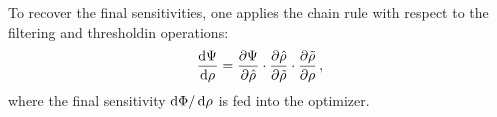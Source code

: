     To recover the final sensitivities, one applies the chain rule with respect to the filtering and thresholdin operations:
    \begin{equation}
        \frac{\mathop{}\!\text{d} \Psi}{\mathop{}\!\text{d} \rho} = \frac{\partial \Psi}{\partial \hat{\rho}} \cdot \frac{\partial \hat{\rho}}{\partial \tilde{\rho}} \cdot \frac{\partial \tilde{\rho}}{\partial \rho}\,,
    \end{equation}
    where the final sensitivity $\mathop{}\!\text{d} \Phi/\mathop{}\!\text{d} \rho$ is fed into the optimizer.










